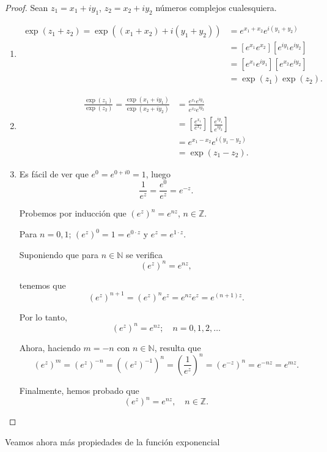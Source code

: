 \begin{proof}
Sean $z_1 = x_1 + iy_1$, $z_2 = x_2 + iy_2$ números complejos cualesquiera. 

\begin{enumerate}
\item 
\begin{align*}
\exp(z_1 + z_2) = \exp((x_1+x_2) + i (y_1+y_2)) &= e^{x_1 + x_2} e^{i(y_1+y_2)} \\
&=  [e^{x_1}e^{x_2}][e^{iy_1} e^{iy_2}] \\
&= [e^{x_1} e^{iy_1}][e^{x_2} e^{iy_2}] \\
 &= \exp(z_1) \exp(z_2).
\end{align*}

\item 
\begin{align*}
\frac{\exp(z_1)}{\exp(z_2)} = \frac{\exp(x_1 + iy_1)}{\exp(x_2+iy_2)} &= \frac{e^{x_1} e^{iy_1}}{e^{x_2} e^{iy_2} } \\
&=  \left[\frac{e^{x_1}}{e^{x_2}}\right]\left[\frac{e^{iy_1}}{e^{iy_2}}\right] \\
&= e^{x_1-x_2} e^{i(y_1-y_2)} \\
&= \exp(z_1-z_2).
\end{align*}

\item Es fácil de ver que $e^0 = e^{0+i0} = 1$, luego 
$$\frac{1}{e^{z}} = \frac{e^0}{e^{z}} = e^{-z}.$$

Probemos por inducción que $(e^{z})^n = e^{nz}$, $n \in \mathbb{Z}$.

Para $n = 0,1$; $(e^{z})^0 = 1 = e^{0\cdot z}$ y $e^z = e^{1\cdot z}$. 

Suponiendo que para $n \in \mathbb{N}$ se verifica 
$$(e^{z})^n = e^{nz},$$

tenemos que 
$$(e^{z})^{n+1} = (e^{z})^n e^z = e^{nz} e^z = e^{(n+1)z}.$$

Por lo tanto, 
$$(e^{z})^n = e^{nz}; \quad n = 0,1,2, \dots$$

Ahora, haciendo $m = -n$ con $n \in \mathbb{N}$, resulta que 
$$(e^z)^m = (e^z)^{-n} = ((e^{z})^{-1})^n = \left(\frac{1}{e^z}\right)^n = (e^{-z})^n = e^{-nz} = e^{mz}. $$

Finalmente, hemos probado que 
$$(e^{z})^n = e^{nz}, \quad n \in \mathbb{Z}.$$

\end{enumerate}
\end{proof}

Veamos ahora más propiedades de la función exponencial

